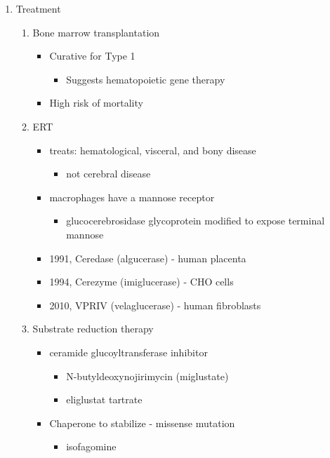 \documentclass{scrartcl}
\begin{document}
\begin{enumerate}
\item Treatment
\label{sec:org80f4b66}
\begin{enumerate}
\item Bone marrow transplantation
\label{sec:orgcc842fd}
\begin{itemize}
\item Curative for Type 1
\begin{itemize}
\item Suggests hematopoietic gene therapy
\end{itemize}
\item High risk of mortality
\end{itemize}
\item ERT
\label{sec:orgcd9e184}
\begin{itemize}
\item treats: hematological, visceral, and bony disease
\begin{itemize}
\item not cerebral disease
\end{itemize}
\item macrophages have a mannose receptor
\begin{itemize}
\item glucocerebrosidase glycoprotein modified to expose terminal mannose
\end{itemize}
\item 1991, Ceredase (algucerase) - human placenta
\item 1994, Cerezyme (imiglucerase) - CHO cells
\item 2010, VPRIV (velaglucerase) - human fibroblasts
\end{itemize}

\item Substrate reduction therapy
\label{sec:orgf7e4c40}
\begin{itemize}
\item ceramide glucoyltransferase inhibitor
\begin{itemize}
\item N-butyldeoxynojirimycin (miglustate)
\item eliglustat tartrate
\end{itemize}
\item Chaperone to stabilize - missense mutation
\begin{itemize}
\item isofagomine
\end{itemize}
\end{itemize}
\end{enumerate}
\end{enumerate}
\end{document}
